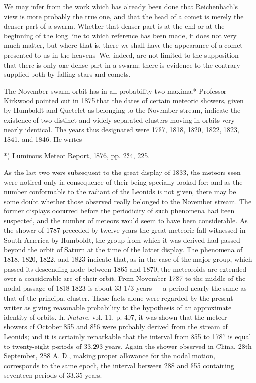 \documentclass[a4paper, 12pt, oneside, polutonikogreek, english]{article}
\begin{document}
We may infer from the work which has already been done that Reichenbach's view is more probably the true one, and that the head of a comet is merely the denser part of a swarm. Whether that denser part is at the end or at the beginning of the long line to which reference has been made, it does not very much matter, but where that is, there we shall have the appearance of a comet presented to us in the heavens. We, indeed, are not limited to the supposition that there is only one dense part in a swarm; there is evidence to the contrary supplied both by falling stars and comets.

The November swarm orbit has in all probability two maxima.* Professor Kirkwood pointed out in 1875 that the dates of certain meteoric showers, given by Humboldt and Quetelet as belonging to the November stream, indicate the existence of two distinct and widely separated clusters moving in orbits very nearly identical. The years thus designated were 1787, 1818, 1820, 1822, 1823, 1841, and 1846. He writes ---

*) Luminous Meteor Report, 1876, pp. 224, 225.

As the last two were subsequent to the great display of 1833, the meteors seen were noticed only in consequence of their being specially looked for; and as the number conformable to the radiant of the Leonids is not given, there may be some doubt whether those observed really belonged to the November stream. The former displays occurred before the periodicity of such phenomena had been suspected, and the number of meteors would seem to have been considerable. As the shower of 1787 preceded by twelve years the great meteoric fall witnessed in South America by Humboldt, the group from which it was derived had passed beyond the orbit of Saturn at the time of the latter display. The phenomena of 1818, 1820, 1822, and 1823 indicate that, as in the case of the major group, which passed its descending node between 1865 and 1870, the meteoroids are extended over a considerable arc of their orbit. From November 1787 to the middle of the nodal passage of 1818-1823 is about 33 1/3 years --- a period nearly the same as that of the principal cluster. These facts alone were regarded by the present writer as giving reasonable probability to the hypothesis of an approximate identity of orbits. In \emph{Nature}, vol. 11. p. 407, it was shown that the meteor showers of October 855 and 856 were probably derived from the stream of Leonids; and it is certainly remarkable that the interval from 855 to 1787 is equal to twenty-eight periods of 33.293 years. Again the shower observed in China, 28th September, 288 A. D., making proper allowance for the nodal motion, corresponds to the same epoch, the interval between 288 and 855 containing seventeen periods of 33.35 years.
\end{document}
